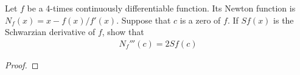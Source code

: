 \begin{problem}{4}
  Let $f$ be a 4-times continuously differentiable function. Its Newton
  function is $N_f(x) = x - f(x)/f'(x)$. Suppose that $c$ is a zero of $f$.
  If $Sf(x)$ is the Schwarzian derivative of $f$, show that
  \begin{align*}
    N_f'''(c) = 2Sf(c)
  \end{align*}
\end{problem}

\begin{proof}
\end{proof}
\newpage
